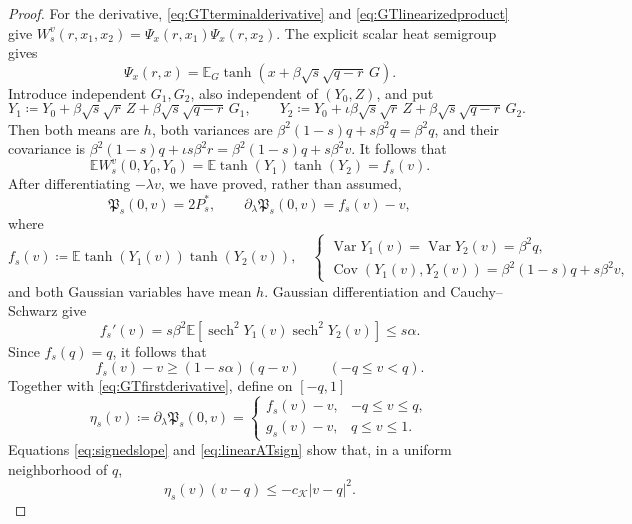 \documentclass[11pt]{article}
\numberwithin{equation}{section}
\newcommand{\E}{\mathbb{E}}
\newcommand{\1}{\mathbf 1}
\newcommand{\sech}{\operatorname{sech}}
\newcommand{\cK}{\mathcal K}
\begin{document}
\begin{proof}
For the derivative, \eqref{eq:GTterminalderivative} and
\eqref{eq:GTlinearizedproduct} give
$W_s^v(r,x_1,x_2)=\Psi_x(r,x_1)\Psi_x(r,x_2)$.  The explicit scalar
heat semigroup gives
\[
 \Psi_x(r,x)=\E_G\tanh(x+\beta\sqrt{s}\sqrt{q-r}\,G).
\]
Introduce independent $G_1,G_2$, also independent of $(Y_0,Z)$, and
put
\[
 Y_1\coloneqq Y_0+\beta\sqrt{s}\sqrt r\,Z
 +\beta\sqrt{s}\sqrt{q-r}\,G_1,\qquad
 Y_2\coloneqq Y_0+\iota\beta\sqrt{s}\sqrt r\,Z
 +\beta\sqrt{s}\sqrt{q-r}\,G_2.
\]
Then both means are $h$, both variances are
$\beta^2(1-s)q+s\beta^2q=\beta^2q$, and their covariance is
$\beta^2(1-s)q+\iota s\beta^2r
=\beta^2(1-s)q+s\beta^2v$.  It follows that
\[
 \E W_s^v(0,Y_0,Y_0)=\E\tanh(Y_1)\tanh(Y_2)=f_s(v).
\]
After differentiating $-\lambda v$, we have proved, rather than
assumed,
\begin{equation}
 \mathfrak P_s(0,v)=2P_s^*,\qquad
 \partial_\lambda\mathfrak P_s(0,v)=f_s(v)-v,
 \label{eq:signedflat}
\end{equation}
where
\begin{equation}
 f_s(v)\coloneqq\E\tanh(Y_1(v))\tanh(Y_2(v)),
 \quad
 \begin{cases}
 \operatorname{Var}Y_1(v)=\operatorname{Var}Y_2(v)=\beta^2q,\\
 \operatorname{Cov}(Y_1(v),Y_2(v))
 =\beta^2(1-s)q+s\beta^2v,
 \end{cases}
 \label{eq:signedf}
\end{equation}
and both Gaussian variables have mean $h$.  Gaussian differentiation
and Cauchy--Schwarz give
\begin{equation}
 f_s'(v)=s\beta^2\E[\sech^2Y_1(v)\sech^2Y_2(v)]
 \le s\alpha.
 \label{eq:signedcontraction}
\end{equation}
Since $f_s(q)=q$, it follows that
\begin{equation}
 f_s(v)-v\ge(1-s\alpha)(q-v)
 \qquad(-q\le v<q).
 \label{eq:signedslope}
\end{equation}
Together with \eqref{eq:GTfirstderivative}, define on $[-q,1]$
\begin{equation}
 \eta_s(v)\coloneqq\partial_\lambda\mathfrak P_s(0,v)
 =
 \begin{cases}
  f_s(v)-v,&-q\le v\le q,\\
  g_s(v)-v,&q\le v\le1.
 \end{cases}
 \label{eq:GTeta}
\end{equation}
Equations \eqref{eq:signedslope} and \eqref{eq:linearATsign} show that,
in a uniform neighborhood of $q$,
\begin{equation}
 \eta_s(v)(v-q)\le-c_{\cK}|v-q|^2.
 \label{eq:GTetaslope}
\end{equation}


\end{proof}
\end{document}
